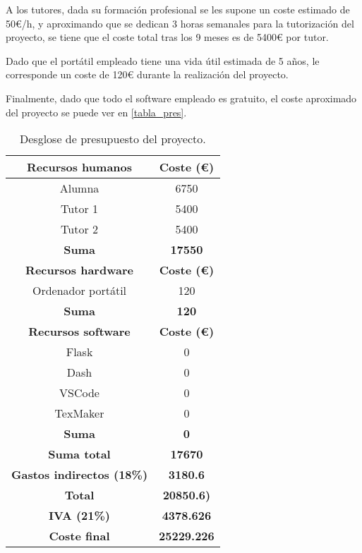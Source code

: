 A los tutores, dada su formación profesional se les supone un coste estimado de 50€/h, y aproximando que se dedican 3 horas semanales para la tutorización del proyecto, se tiene que el coste total tras los 9 meses es de 5400€ por tutor.

Dado que el portátil empleado tiene una vida útil estimada de 5 años, le corresponde un coste de 120€ durante la realización del proyecto.

Finalmente, dado que todo el software empleado es gratuito, el coste aproximado del proyecto se puede ver en \eqref{tabla_pres}.

\begin{table}[!h]
\caption{Desglose de presupuesto del proyecto.}
\begin{center}
\begin{tabular}{|c c|} 
 \hline
 \textbf{Recursos humanos} & \textbf{Coste (€)} \\ 
 \hline\hline
 Alumna & 6750 \\
 \hline
 Tutor 1 & 5400 \\
 \hline 
 Tutor 2 & 5400 \\
 \textbf{Suma} & \textbf{17550} \\
 \hline
 \textbf{Recursos hardware} & \textbf{Coste (€)} \\ 
 \hline\hline
 Ordenador portátil & 120 \\
 \hline
 \textbf{Suma} & \textbf{120} \\
 \hline 
 \textbf{Recursos software} & \textbf{Coste (€)} \\
 \hline
  Flask & 0 \\
  \hline
  Dash & 0 \\
  \hline 
  VSCode & 0 \\
  \hline
  TexMaker & 0 \\
  \hline 
  \textbf{Suma} & \textbf{0} \\ 
 \hline\hline
 \textbf{Suma total} & \textbf{17670} \\
 \hline\hline
 \textbf{Gastos indirectos (18\%)} & \textbf{3180.6} \\ 
 \hline\hline
 \textbf{Total} & \textbf{20850.6)} \\ 
 \hline\hline
 \textbf{IVA (21\%)} & \textbf{4378.626} \\ 
 \hline\hline
 \textbf{Coste final} & \textbf{25229.226} \\ 
 \hline\hline

 \hline
\end{tabular}
\label{tabla_pres}
\end{center}
\end{table}

